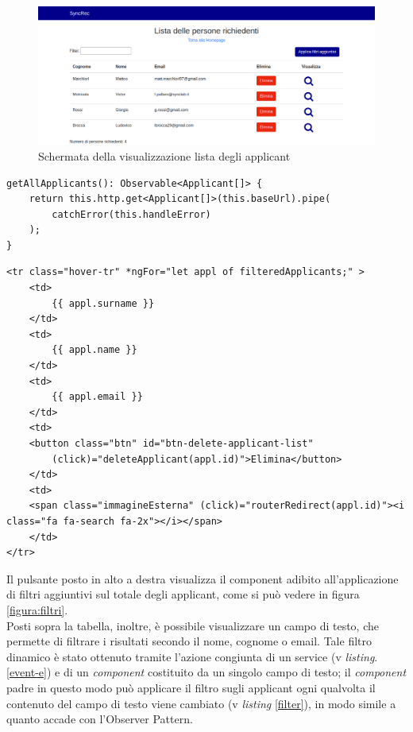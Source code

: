 \vspace{0.5em}
\begin{figure}[!h] 
	\centering 
	\includegraphics[width=1\columnwidth]{immagini/svil/lista} 
	\caption{Schermata della visualizzazione lista degli applicant}
	\label{figura:lista}
\end{figure}

\begin{lstlisting}[label=get-applicant,caption=Funzione del service che effettua la chiamata GET]
getAllApplicants(): Observable<Applicant[]> {
	return this.http.get<Applicant[]>(this.baseUrl).pipe(
		catchError(this.handleError)
	);
}
\end{lstlisting} 

\begin{lstlisting}[label=ng-for,caption=Visualizzazione degli applicant nel codice HTML]
<tr class="hover-tr" *ngFor="let appl of filteredApplicants;" >
	<td>
		{{ appl.surname }}
	</td>
	<td>
		{{ appl.name }}
	</td>
	<td>
		{{ appl.email }}
	</td>
	<td>
	<button class="btn" id="btn-delete-applicant-list"
		(click)="deleteApplicant(appl.id)">Elimina</button>
	</td>
	<td>
	<span class="immagineEsterna" (click)="routerRedirect(appl.id)"><i class="fa fa-search fa-2x"></i></span>
	</td>
</tr>
\end{lstlisting} 

Il pulsante posto in alto a destra visualizza il component adibito all'applicazione di filtri aggiuntivi sul totale degli applicant, come si può vedere in figura \ref{figura:filtri}.\\
Posti sopra la tabella, inoltre, è possibile visualizzare un campo di testo, che permette di filtrare i risultati secondo il nome, cognome o email. Tale filtro dinamico è stato ottenuto tramite l'azione congiunta di un service (v \textit{listing}. \ref{event-e}) e di un \textit{component} costituito da un singolo campo di testo; il \textit{component} padre in questo modo può applicare il filtro sugli applicant ogni qualvolta il contenuto del campo di testo viene cambiato (v \textit{listing} \ref{filter}), in modo simile a quanto accade con l'\gls{Observer Pattern}.

